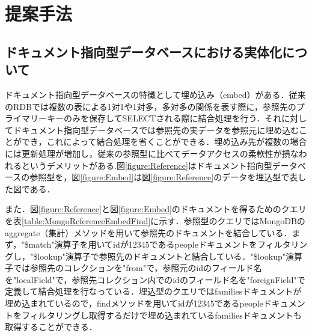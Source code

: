 \documentclass[a4paper,11pt]{ujreport}
\begin{document}
\chapter{提案手法}
\label{chap:ProposedAlgorithm}
\section{ドキュメント指向型データベースにおける実体化について}
\label{section:AboutMvInDocumentDB}
ドキュメント指向型データベースの特徴として埋め込み（embed）がある．従来のRDBでは複数の表による1対1や1対多，多対多の関係を表す際に，参照先のプライマリーキーのみを保存してSELECTされる際に結合処理を行う．それに対してドキュメント指向型データベースでは参照先の実データを参照元に埋め込むことができ，これによって結合処理を省くことができる．埋め込み先が複数の場合には更新処理が増加し，従来の参照型に比べてデータアクセスの柔軟性が損なわれるというデメリットがある\cite{Sky株式会社201212}.図\ref{figure:Reference}はドキュメント指向型データベースの参照型を，図\ref{figure:Embed}は図\ref{figure:Reference}のデータを埋込型で表した図である．

また．図\ref{figure:Reference}と図\ref{figure:Embed}のドキュメントを得るためのクエリを表\ref{table:MongoReferenceEmbedFind}に示す．参照型のクエリではMongoDBのaggregate（集計）メソッドを用いて参照先のドキュメントを結合している．まず，"\$match"演算子を用いてidが12345であるpeopleドキュメントをフィルタリングし，"\$lookup"演算子で参照先のドキュメントと結合している．"\$lookup"演算子では参照先のコレクションを"from"で，参照元のidのフィールド名を"localField"で，参照先コレクション内でのidのフィールド名を"foreignField"で定義して結合処理を行なっている．埋込型のクエリではfamiliesドキュメントが埋め込まれているので，findメソッドを用いてidが12345であるpeopleドキュメントをフィルタリングし取得するだけで埋め込まれているfamiliesドキュメントも取得することができる．
\end{document}
